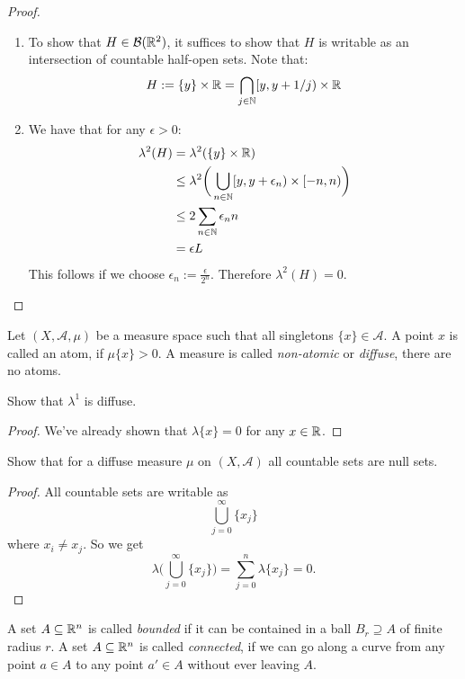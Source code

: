 \begin{proof}
\begin{enumerate}
  \item To show that \(H\in \mathcal{B}(\Bbb{R}^2)\), it suffices to show that \(H\) is writable as an intersection of countable half-open sets.
Note that:
\[
H:=\{y\}\times\Bbb{R}=\bigcap _{j\in \Bbb{N}} [y,y+1/j)\times\Bbb{R}
\]
  \item We have that for any \(\epsilon>0\):
\begin{align*}
\lambda ^2(H)&=\lambda ^2 (\{y\} \times \Bbb R) \\
&\leq \lambda ^2\bigg(\bigcup _{n\in \Bbb{N}}[y,y+\epsilon_n)\times[-n,n) \bigg) \\
&\leq 2 \sum _{n\in \Bbb{N}} \epsilon_n n \\
&=\epsilon L
\end{align*}
This follows if we choose $\epsilon_n := \frac{\epsilon}{2^n}$. Therefore \(\lambda ^2(H)=0.\)
\end{enumerate}

\end{proof}

\begin{defn}
Let \((X,\mathcal{A},\mu )\) be a measure space such that all singletons \(\{x\}\in \mathcal{A}.\) A point \(x\) is called an atom, if \(\mu \{x\}>0.\) A measure is called \emph{non-atomic} or \emph{diffuse}, there are no atoms.
\end{defn}

\begin{thm}[Problem 6.5i]
Show that \(\lambda ^{1}\) is diffuse.
\end{thm}

\begin{proof}
We've already shown that \(\lambda \{x\}=0\) for any \(x\in \Bbb{R}\).
\end{proof}

\begin{thm}
Show that for a diffuse measure \(\mu \) on \((X,\mathcal{A})\) all countable sets are null sets.
\end{thm}

\begin{proof}
All countable sets are writable as
\[
\bigcup _{j=0}^\infty \{x_{j}\}
\]
where \(x_{i}\neq x_{j}\). So we get
\[
\lambda \bigg(\bigcup _{j=0}^\infty \{x_{j}\}\bigg)=\sum _{j=0}^n\lambda \{x_{j}\}=0.
\]
\end{proof}

\begin{defn}
A set \(A\subseteq \Bbb{R}^n\) is called \emph{bounded} if it can be contained in a ball \(B_{r}\supseteq A\) of finite radius \(r\). A set \(A\subseteq \Bbb{R}^n\) is called \emph{connected}, if we can go along a curve from any point \(a\in A\) to any point \(a'\in A\) without ever leaving \(A\).
\end{defn}

